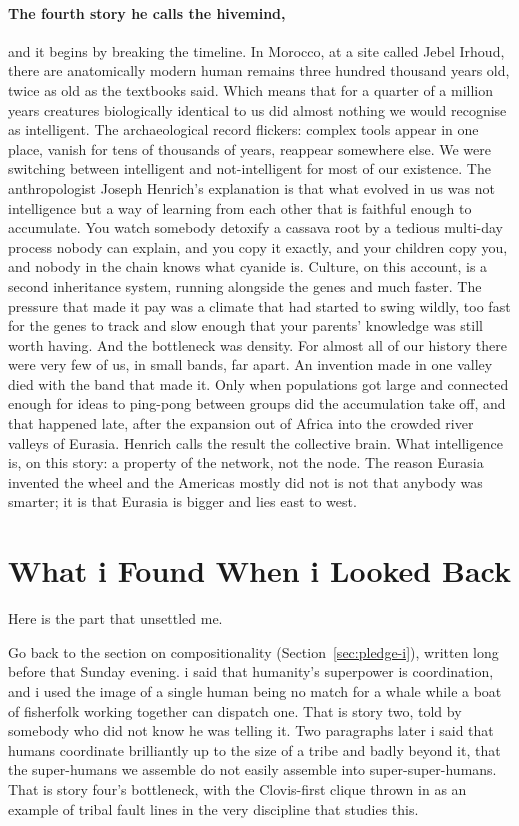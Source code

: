 \paragraph{The fourth story he calls the hivemind,} and it begins by breaking the timeline. In Morocco, at a site called Jebel Irhoud, there are anatomically modern human remains three hundred thousand years old, twice as old as the textbooks said. Which means that for a quarter of a million years creatures biologically identical to us did almost nothing we would recognise as intelligent. The archaeological record flickers: complex tools appear in one place, vanish for tens of thousands of years, reappear somewhere else. We were switching between intelligent and not-intelligent for most of our existence. The anthropologist Joseph Henrich's explanation is that what evolved in us was not intelligence but a way of learning from each other that is faithful enough to accumulate. You watch somebody detoxify a cassava root by a tedious multi-day process nobody can explain, and you copy it exactly, and your children copy you, and nobody in the chain knows what cyanide is. Culture, on this account, is a second inheritance system, running alongside the genes and much faster. The pressure that made it pay was a climate that had started to swing wildly, too fast for the genes to track and slow enough that your parents' knowledge was still worth having. And the bottleneck was density. For almost all of our history there were very few of us, in small bands, far apart. An invention made in one valley died with the band that made it. Only when populations got large and connected enough for ideas to ping-pong between groups did the accumulation take off, and that happened late, after the expansion out of Africa into the crowded river valleys of Eurasia. Henrich calls the result the collective brain. What intelligence is, on this story: a property of the network, not the node. The reason Eurasia invented the wheel and the Americas mostly did not is not that anybody was smarter; it is that Eurasia is bigger and lies east to west.

\section{What i Found When i Looked Back}

Here is the part that unsettled me.

Go back to the section on compositionality (Section~\ref{sec:pledge-i}), written long before that Sunday evening. i said that humanity's superpower is coordination, and i used the image of a single human being no match for a whale while a boat of fisherfolk working together can dispatch one. That is story two, told by somebody who did not know he was telling it. Two paragraphs later i said that humans coordinate brilliantly up to the size of a tribe and badly beyond it, that the super-humans we assemble do not easily assemble into super-super-humans. That is story four's bottleneck, with the Clovis-first clique thrown in as an example of tribal fault lines in the very discipline that studies this.

